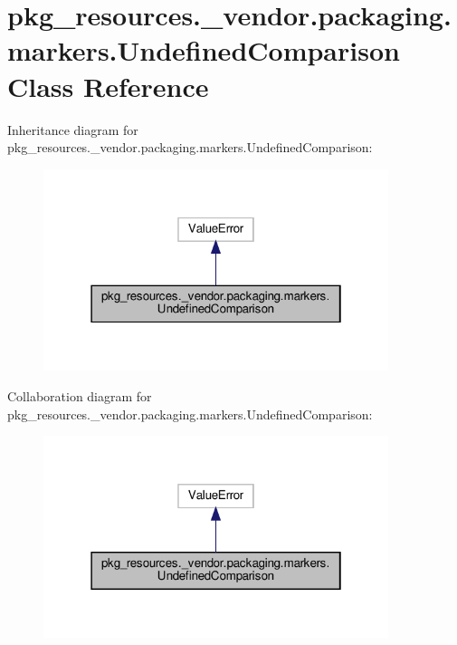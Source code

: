 \hypertarget{classpkg__resources_1_1__vendor_1_1packaging_1_1markers_1_1UndefinedComparison}{}\section{pkg\+\_\+resources.\+\_\+vendor.\+packaging.\+markers.\+Undefined\+Comparison Class Reference}
\label{classpkg__resources_1_1__vendor_1_1packaging_1_1markers_1_1UndefinedComparison}


Inheritance diagram for pkg\+\_\+resources.\+\_\+vendor.\+packaging.\+markers.\+Undefined\+Comparison\+:
\nopagebreak
\begin{figure}[H]
\begin{center}
\leavevmode
\includegraphics[width=286pt]{classpkg__resources_1_1__vendor_1_1packaging_1_1markers_1_1UndefinedComparison__inherit__graph}
\end{center}
\end{figure}


Collaboration diagram for pkg\+\_\+resources.\+\_\+vendor.\+packaging.\+markers.\+Undefined\+Comparison\+:
\nopagebreak
\begin{figure}[H]
\begin{center}
\leavevmode
\includegraphics[width=286pt]{classpkg__resources_1_1__vendor_1_1packaging_1_1markers_1_1UndefinedComparison__coll__graph}
\end{center}
\end{figure}


